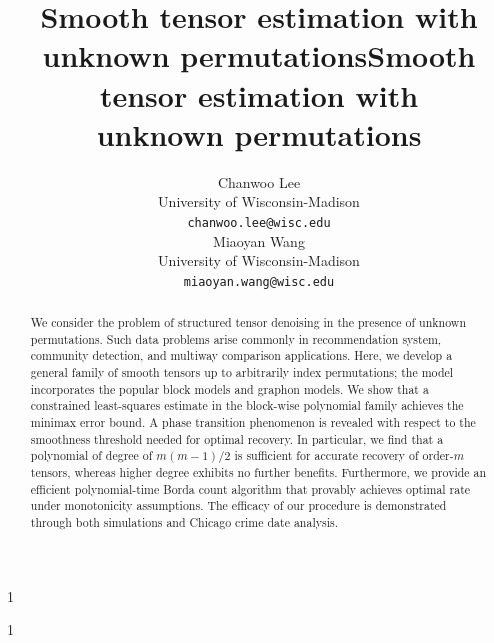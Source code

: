 \documentclass{article}
\newcommand{\blind}{1}
\theoremstyle{definition}
\begin{document}
\blind
{   \title{Smooth tensor estimation with \\
unknown permutations}
\author{%
  Chanwoo Lee \\
  University of Wisconsin-Madison\\
  \texttt{chanwoo.lee@wisc.edu} \\
   \And
   Miaoyan Wang \\
   University of Wisconsin-Madison \\
   \texttt{miaoyan.wang@wisc.edu} }

    \maketitle
} \fi

\blind
{
 \date{}
  \title{Smooth tensor estimation with \\
unknown permutations}
\author{}
\maketitle
} \fi



\begin{abstract}
 We consider the problem of structured tensor denoising in the presence of unknown permutations. Such data problems arise commonly in recommendation system, community detection, and multiway comparison applications. Here, we develop a general family of smooth tensors up to arbitrarily index permutations; the model incorporates the popular block models and graphon models. We show that a constrained least-squares estimate in the block-wise polynomial family achieves the minimax error bound. A phase transition phenomenon is revealed with respect to the smoothness threshold needed for optimal recovery. In particular, we find that a polynomial of degree of $m(m-1)/2$ is sufficient for accurate recovery of order-$m$ tensors, whereas higher degree exhibits no further benefits.  Furthermore, we provide an efficient polynomial-time Borda count algorithm that provably achieves optimal rate under monotonicity assumptions. The efficacy of our procedure is demonstrated through both simulations and Chicago crime date analysis. 
\end{abstract}
\vspace{-.5cm}
\end{document}

